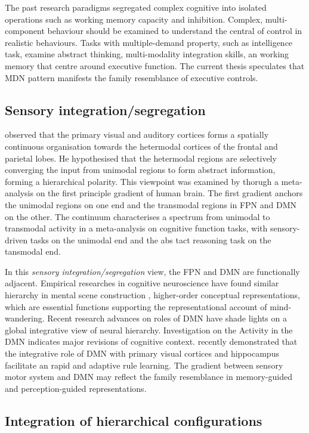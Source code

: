 The past research paradigms segregated complex cognitive into isolated operations such as working memory capacity and inhibition. Complex, multi-component behaviour should be examined to understand the central of control in realistic behaviours. Tasks with multiple-demand property, such as intelligence task, examine abstract thinking, multi-modality integration skills, an working memory that centre around executive function. The current thesis speculates that MDN pattern manifests the family resemblance of executive controls. 

\subsection{Sensory integration/segregation}
 observed that the primary visual and auditory cortices forms a spatially continuous organisation towards the hetermodal cortices of the frontal and parietal lobes. He hypothesised that the hetermodal regions are selectively converging the input from unimodal regions to form abstract information, forming a hierarchical polarity. This viewpoint was examined by  thorugh a meta-analysis on the first principle gradient of human brain. The first gradient anchors the unimodal regions on one end and the transmodal regions in FPN and DMN on the other. The continuum characterises a spectrum from unimodal to transmodal activity in a meta-analysis on cognitive function tasks, with sensory-driven tasks on the unimodal end and the abs tact reasoning task on the tansmodal end. 

In this \textit{sensory integration/segregation} view, the FPN and DMN are functionally adjacent. Empirical researches in cognitive neuroscience have found similar hierarchy in mental scene construction \cite{Villena-Gonzalez2018}, higher-order conceptual representations\cite{Murphy2018}, which are essential functions supporting the representational account of mind-wandering. Recent research advances on roles of DMN have shade lights on a global integrative view of neural hierarchy. Investigation on the Activity in the DMN indicates major revisions of cognitive context.  recently demonstrated that the integrative role of DMN with primary visual cortices and hippocampus facilitate an rapid and adaptive rule learning. The gradient between sensory motor system and DMN may reflect the family resemblance in memory-guided and perception-guided representations.


\subsection{Integration of hierarchical configurations}

